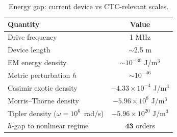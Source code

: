 \begin{table}[h]
\centering
\caption{Energy gap: current device vs CTC-relevant scales.}
\label{tab:energy_gap}
\begin{tabular}{lc}
\hline
Quantity & Value \\
\hline
Drive frequency & 1 MHz \\
Device length & $\sim$2.5 m \\
EM energy density & $\sim 10^{-30}$ J/m$^3$ \\
Metric perturbation $h$ & $\sim 10^{-46}$ \\
Casimir exotic density & $-4.33\times 10^{-4}$ J/m$^3$ \\
Morris--Thorne density & $-5.96\times 10^{8}$ J/m$^3$ \\
Tipler density ($\omega=10^6$~rad/s) & $-5.96\times 10^{20}$ J/m$^3$ \\
$h$-gap to nonlinear regime & $\mathbf{43}$ orders \\
\hline
\end{tabular}
\end{table}
